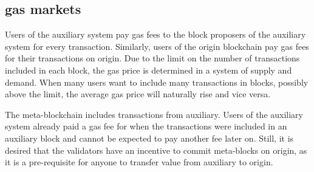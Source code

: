 \documentclass[12pt,a4paper]{article}
\begin{document}

%




\subsection{gas markets}

Users of the auxiliary system pay gas fees to the block proposers of the auxiliary system for every transaction.
Similarly, users of the origin blockchain pay gas fees for their transactions on origin.
Due to the limit on the number of transactions included in each block, the gas price is determined in a system of supply and demand.
When many users want to include many transactions in blocks, possibly above the limit, the average gas price will naturally rise and vice versa.

The meta-blockchain includes transactions from auxiliary.
Users of the auxiliary system already paid a gas fee for when the transactions were included in an auxiliary block and cannot be expected to pay another fee later on.
Still, it is desired that the validators have an incentive to commit meta-blocks on origin, as it is a pre-requisite for anyone to transfer value from auxiliary to origin.
\end{document}
